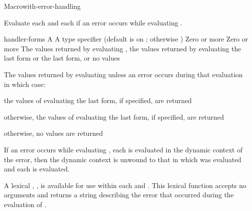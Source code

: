 \documentclass[10pt,twoside,english,pdftex]{article}
\begin{document}
\begin{functiondoc}{Macro}{with-error-handling}{%
    \nobr{[\var{form\/} \vbar{}}
    }
%
%
%  
%  
\fnsyntax

\fnpurpose Evaluate each  and each
 if an error occurs while evaluating .

\fnpackage {}

\fnmodule {}

\fnargs
\begin{args}{handler-forms}
\arg[form] A 
\arg[type] A type specifier (default is  on ; 
  otherwise )
 Zero or more 
 Zero or more 
\arg[results] The values returned by evaluating , the values
  returned by evaluating the last  form or the last 
   form, or no values
\end{args}

\fnreturns The values returned by evaluating  unless an
error occurs during that evaluation in which case:
\begin{tightitemize}
\item the values of evaluating the last  form, if
  specified, are returned
\item otherwise, the values of evaluating the last 
  form, if specified, are returned
\item otherwise, no values are returned
\end{tightitemize}

\fndescription If an error occurs while evaluating , each
 is evaluated in the dynamic context of the error,
then the dynamic context is unwound to that in which  was
evaluated and each  is evaluated.

A lexical , , is available for
use within each  and .  This
lexical function accepts no arguments and returns a string describing the
error that occurred during the evaluation of .


\end{functiondoc}
\end{document}

